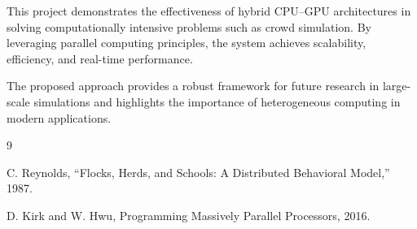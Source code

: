 \documentclass[12pt,a4paper]{report}
\begin{document}
This project demonstrates the effectiveness of hybrid CPU--GPU architectures in solving computationally intensive problems such as crowd simulation. By leveraging parallel computing principles, the system achieves scalability, efficiency, and real-time performance.

The proposed approach provides a robust framework for future research in large-scale simulations and highlights the importance of heterogeneous computing in modern applications.

\begin{thebibliography}{9}

C. Reynolds, “Flocks, Herds, and Schools: A Distributed Behavioral Model,” 1987.

D. Kirk and W. Hwu, Programming Massively Parallel Processors, 2016.

\end{thebibliography}
\end{document}
